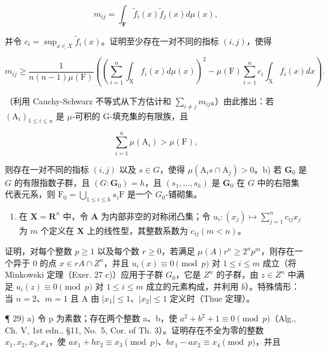 \[
m _ {i j} = \int_ {\mathbf {F}} \widetilde {f} _ {i} (x) \widetilde {f} _ {j} (x) d \mu (x),
\]

并令 \(c_{i} = \sup_{x\in X}\widetilde{f}_{i}(x)\)。证明至少存在一对不同的指标 \((i,j)\)，使得

\[
m _ {i j} \geqslant \frac {1}{n (n - 1) \mu (\mathrm{F})} \left(\left(\sum_ {i = 1} ^ {n} \int_ {\mathrm{X}} f _ {i} (x) d \mu (x)\right) ^ {2} - \mu (\mathrm{F}) \sum_ {i = 1} ^ {n} c _ {i} \int_ {\mathrm{X}} f _ {i} (x) d x\right).
\]

（利用 Cauchy-Schwarz 不等式从下方估计和 \(\sum_{i\neq j}m_{ij}\)。）由此推出：若 \((\mathrm{A}_i)_{1\leqslant i\leqslant n}\) 是 \(\mu\)-可积的 G-填充集的有限族，且

\[
\sum_ {i = 1} ^ {n} \mu (\mathrm{A} _ {i}) > \mu (\mathrm{F}),
\]

则存在一对不同的指标 \((i,j)\) 以及 \(s\in G\)，使得 \(\mu (\mathrm{A}_is\cap \mathrm{A}_j) > 0\)。b) 若 \(\mathbf{G}_0\) 是 \(G\) 的有限指数子群，且 \((G:\mathbf{G}_0) = h\)，且 \((s_1,\ldots ,s_h)\) 是 \(\mathbf{G}_0\) 在 \(G\) 中的右陪集代表元系，则 \(\mathrm{F_0} = \bigcup_{1\leqslant i\leqslant h}s_i\mathrm{F}\) 是一个 \(G_{0}\)-铺砌集。

\begin{enumerate}
\def\labelenumi{\alph{enumi})}
\setcounter{enumi}{2}
\tightlist
\item
  在 \(\mathbf{X} = \mathbf{R}^n\) 中，令 \(\mathbf{A}\) 为内部非空的对称闭凸集；令 \(u_i : (x_j) \mapsto \sum_{j=1}^{n} c_{ij} x_j\) 为 \(m\) 个定义在 \(\mathbf{X}\) 上的线性型，其整数系数为 \(c_{ij} (m < n)\)。
\end{enumerate}

证明，对每个整数 \(p \geqslant 1\) 以及每个数 \(r \geqslant 0\)，若满足 \(\mu(A)r^n \geqslant 2^n p^m\)，则存在一个异于 0 的点 \(x \in rA \cap Z^n\)，并且 \(u_i(x) \equiv 0 \pmod{p}\) 对 \(1 \leqslant i \leqslant m\) 成立（将 Minkowski 定理（Exer. 27 c)）应用于子群 \(G_0\)，它是 \(Z^n\) 的子群，由 \(z \in Z^n\) 中满足 \(u_i(z) \equiv 0 \pmod{p}\) 对 \(1 \leqslant i \leqslant m\) 成立的元素构成，并利用 \(b\)）。特殊情形：当 \(n = 2\)、\(m = 1\) 且 A 由 \(|x_1| \leqslant 1\)、\(|x_2| \leqslant 1\) 定义时（Thue 定理）。

¶ 29) a) 令 p 为素数；存在两个整数 a、b，使 \(a^{2}+b^{2}+1 \equiv 0 \pmod{p}\)（Alg., Ch. V, 1st edn., §11, No.~5, Cor. of Th. 3）。证明存在不全为零的整数 \(x_{1}, x_{2}, x_{3}, x_{4}\)，使 \(ax_{1} + bx_{2} \equiv x_{3} \pmod{p}\)、\(bx_{1} - ax_{2} \equiv x_{4} \pmod{p}\)，并且


